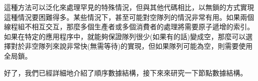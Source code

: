 這種方法可以泛化來處理罕見的特殊情況，但與其他代碼相比，以無鎖的方式實現這種情況要困難得多。某些情況下，甚至可能對空隊列的情況非常有用。如果兩個線程組不相互交互，那麼多個生產者或多個消費者的處理將需要原子遞增的索引。如果在特定的應用程序中，就能夠保證隊列很少(如果有的話)變成空，那麼可以選擇對於非空隊列來說非常快(無需等待)的實現，但如果隊列可能為空，則需要使用全局鎖。

好了，我們已經詳細地介紹了順序數據結構，接下來來研究一下節點數據結構。






























